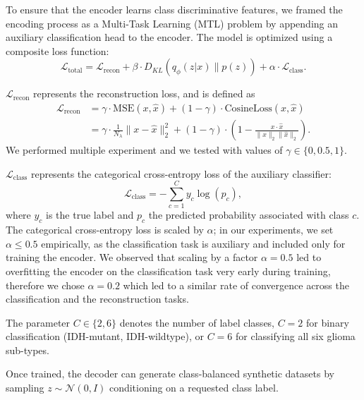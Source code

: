 To ensure that the encoder learns class discriminative features, we framed the encoding process as a Multi-Task Learning (MTL) problem by appending an auxiliary classification head to the encoder.
The model is optimized using a composite loss function:
\begin{equation}
\mathcal{L}_{\text{total}} = \mathcal{L}_{\text{recon}} + \beta \cdot D_{KL}(q_\phi(z|x) \| p(z)) + \alpha \cdot \mathcal{L}_{\text{class}}. 
\end{equation}

$\mathcal{L}_{\text{recon}}$ represents the reconstruction loss, and is defined as
\begin{align}
\mathcal{L}_{\text{recon}} &= \gamma \cdot \text{MSE}(x, \hat{x}) + (1 - \gamma) \cdot \text{CosineLoss}(x, \hat{x}) \\
\nonumber &= \gamma \cdot \frac{1}{N_{\lambda}} \| x - \hat{x} \|_2^2 + (1 - \gamma) \cdot \left(1 - \frac{x \cdot \hat{x}}{\|x\|_2 \|\hat{x}\|_2}\right). 
\end{align} 
We performed multiple experiment and we tested with values of $\gamma \in \{0, 0.5, 1\}$.

$\mathcal{L}_{\text{class}}$ represents the categorical cross-entropy loss of the auxiliary classifier: 
\begin{equation}
\mathcal{L}_{\text{class}} = - \sum_{c=1}^{C} y_c \log(p_c),
\end{equation} where $y_c$ is the true label and $p_c$ the predicted probability associated with class $c$. The categorical cross-entropy loss is scaled by $\alpha$; in our experiments, we set $\alpha \le 0.5$ empirically, as the classification task is auxiliary and included only for training the encoder. We observed that scaling by a factor $\alpha = 0.5$ led to overfitting the encoder on the classification task very early during training, therefore we chose $\alpha = 0.2$ which led to a similar rate of convergence across the classification and the reconstruction tasks.

The parameter $C \in \{2, 6\}$ denotes the number of label classes, $C=2$ for binary classification (IDH-mutant, IDH-wildtype), or $C = 6$ for classifying all six glioma sub-types.

Once trained, the decoder can generate class-balanced synthetic datasets
by sampling $z \sim \mathcal{N}(0, I)$ conditioning on a requested class label.

